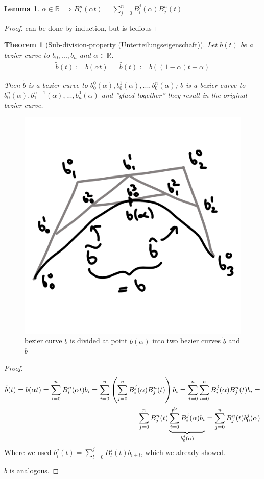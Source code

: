 \documentclass[]{article}
\newtheorem{lemma}{Lemma}
\newtheorem{theorem}{Theorem}
\begin{document}
\begin{lemma}
	$\alpha \in \mathbb{R} \implies B_i^n(\alpha t) = \sum_{j=0}^{n} B_i^j(\alpha) B_j^n(t)$
\end{lemma}

\begin{proof}
	can be done by induction, but is tedious
\end{proof}

\begin{theorem}[Sub-division-property (Unterteilungseigenschaft)]
	Let $b(t)$ be a bezier curve to $b_0, ..., b_n$ and $\alpha \in \mathbb{R}$.
	\begin{align*}
		\tilde{b}(t) := b(\alpha t) && \hat{b}(t) := b((1-\alpha)t + \alpha)
	\end{align*}
	
	Then $\tilde{b}$ is a bezier curve to $b_0^0(\alpha), b_0^1(\alpha), ..., b_0^n(\alpha)$; $\hat{b}$ is a bezier curve to $b_0^n(\alpha), b_1^{n-1}(\alpha), ..., b_n^0(\alpha)$ and ''glued together'' they result in the original bezier curve.
\end{theorem}

\begin{figure}[h!]
	\centering
	\includegraphics[width=0.3\linewidth]{figures/sub_division}
	\caption{bezier curve $b$ is divided at point $b(\alpha)$ into two bezier curves $\tilde{b}$ and $\hat{b}$}
	\label{fig:sub_division}
\end{figure}

\begin{proof}
	\begin{align*}
		\tilde{b}(t) = b(\alpha t) = \sum_{i=0}^{n} B_i^n(\alpha t) b_i = \sum_{i=0}^{n} \left(\sum_{j=0}^{n}B_i^j(\alpha) B_j^n(t)\right) b_i = \sum_{j=0}^{n} \sum_{i=0}^{n} B_i^j(\alpha) B_j^n(t) b_i =\\
		\sum_{j=0}^{n} B_j^n(t) \underbrace{\sum_{i=0}^{\cancel{n}^j} B_i^j(\alpha) b_i}_{b_0^j(\alpha)} = \sum_{j=0}^{n} B_j^n(t) b_0^j(\alpha)
	\end{align*}
	Where we used $b_i^j(t) = \sum_{l=0}^{j} B_l^j(t) b_{i+l}$, which we already showed.
	
	$\hat{b}$ is analogous.
\end{proof}
\end{document}
